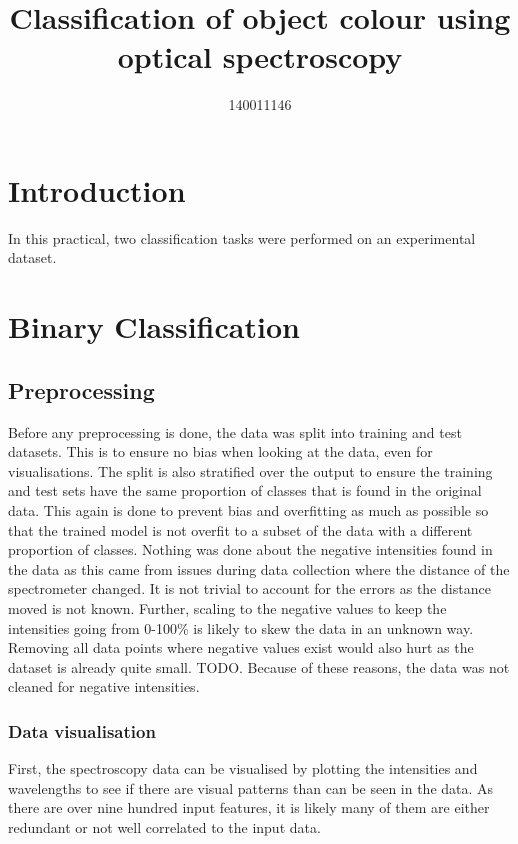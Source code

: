 \documentclass{article}
\title{Classification of object colour using optical spectroscopy}
\author{140011146}
\begin{document}




\section{Introduction}

In this practical, two classification tasks were performed on an experimental dataset. 

\section{Binary Classification}

\subsection{Preprocessing}
Before any preprocessing is done, the data was split into training and test datasets. This is to ensure no bias when looking at the data, even for visualisations. The split is also stratified over the output to ensure the training and test sets have the same proportion of classes that is found in the original data. This again is done to prevent bias and overfitting as much as possible so that the trained model is not overfit to a subset of the data with a different proportion of classes. 
\n
Nothing was done about the negative intensities found in the data as this came from issues during data collection where the distance of the spectrometer changed. It is not trivial to account for the errors as the distance moved is not known. Further, scaling to the negative values to keep the intensities going from 0-100\% is likely to skew the data in an unknown way. Removing all data points where negative values exist would also hurt as the dataset is already quite small. TODO. Because of these reasons, the data was not cleaned for negative intensities. 


\subsubsection{Data visualisation}
First, the spectroscopy data can be visualised by plotting the intensities and wavelengths to see if there are visual patterns than can be seen in the data. As there are over nine hundred input features, it is likely many of them are either redundant or not well correlated to the input data. 
\end{document}
